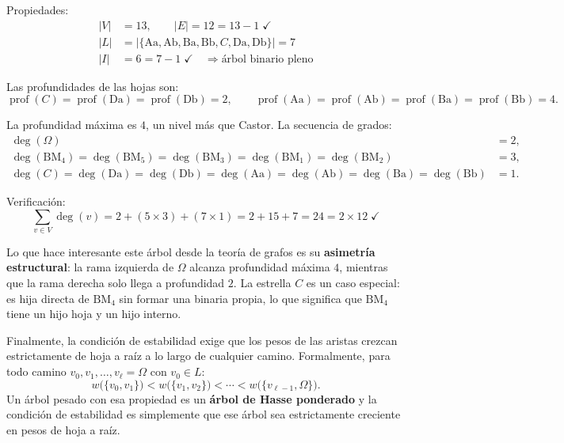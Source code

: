 \documentclass[a4paper]{article}
\begin{document}
Propiedades:
\begin{align*}
|V| &= 13, \qquad |E| = 12 = 13 - 1 \;\checkmark\\
|L| &= |\{\mathrm{Aa},\mathrm{Ab},\mathrm{Ba},\mathrm{Bb},C,
           \mathrm{Da},\mathrm{Db}\}| = 7\\
|I| &= 6 = 7 - 1 \;\checkmark \quad \Rightarrow \text{árbol binario pleno}
\end{align*}

Las profundidades de las hojas son:
$$\operatorname{prof}(C)
= \operatorname{prof}(\mathrm{Da})
= \operatorname{prof}(\mathrm{Db}) = 2,
\qquad
\operatorname{prof}(\mathrm{Aa})
= \operatorname{prof}(\mathrm{Ab})
= \operatorname{prof}(\mathrm{Ba})
= \operatorname{prof}(\mathrm{Bb}) = 4.$$

La profundidad máxima es $4$, un nivel más que Castor. La secuencia
de grados:
\begin{align*}
\deg(\Omega) &= 2,\\
\deg(\mathrm{BM_4}) = \deg(\mathrm{BM_5}) = \deg(\mathrm{BM_3})
  = \deg(\mathrm{BM_1}) = \deg(\mathrm{BM_2}) &= 3,\\
\deg(C) = \deg(\mathrm{Da}) = \deg(\mathrm{Db})
  = \deg(\mathrm{Aa}) = \deg(\mathrm{Ab})
  = \deg(\mathrm{Ba}) = \deg(\mathrm{Bb}) &= 1.
\end{align*}

Verificación:
$$\sum_{v \in V} \deg(v) = 2 + (5 \times 3) + (7 \times 1)
= 2 + 15 + 7 = 24 = 2 \times 12 \;\checkmark$$

Lo que hace interesante este árbol desde la teoría de grafos es su
\textbf{asimetría estructural}: la rama izquierda de $\Omega$ alcanza
profundidad máxima $4$, mientras que la rama derecha solo llega a
profundidad $2$. La estrella $C$ es un caso especial: es hija directa
de $\mathrm{BM_4}$ sin formar una binaria propia, lo que significa que
$\mathrm{BM_4}$ tiene un hijo hoja y un hijo interno.

Finalmente, la condición de estabilidad exige que los pesos de las
aristas crezcan estrictamente de hoja a raíz a lo largo de cualquier
camino. Formalmente, para todo camino
$v_0, v_1, \ldots, v_\ell = \Omega$ con $v_0 \in L$:
$$w\bigl(\{v_0, v_1\}\bigr)
< w\bigl(\{v_1, v_2\}\bigr)
< \cdots
< w\bigl(\{v_{\ell-1}, \Omega\}\bigr).$$
Un árbol pesado con esa propiedad es un \textbf{árbol de Hasse
ponderado} y la condición de estabilidad es simplemente que ese
árbol sea estrictamente creciente en pesos de hoja a raíz.




 
\end{document}
